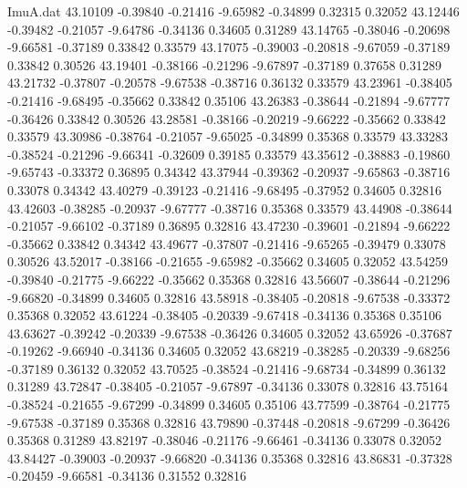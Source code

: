 \begin{filecontents}{ImuA.dat}
  43.10109   -0.39840   -0.21416   -9.65982   -0.34899    0.32315    0.32052
  43.12446   -0.39482   -0.21057   -9.64786   -0.34136    0.34605    0.31289
  43.14765   -0.38046   -0.20698   -9.66581   -0.37189    0.33842    0.33579
  43.17075   -0.39003   -0.20818   -9.67059   -0.37189    0.33842    0.30526
  43.19401   -0.38166   -0.21296   -9.67897   -0.37189    0.37658    0.31289
  43.21732   -0.37807   -0.20578   -9.67538   -0.38716    0.36132    0.33579
  43.23961   -0.38405   -0.21416   -9.68495   -0.35662    0.33842    0.35106
  43.26383   -0.38644   -0.21894   -9.67777   -0.36426    0.33842    0.30526
  43.28581   -0.38166   -0.20219   -9.66222   -0.35662    0.33842    0.33579
  43.30986   -0.38764   -0.21057   -9.65025   -0.34899    0.35368    0.33579
  43.33283   -0.38524   -0.21296   -9.66341   -0.32609    0.39185    0.33579
  43.35612   -0.38883   -0.19860   -9.65743   -0.33372    0.36895    0.34342
  43.37944   -0.39362   -0.20937   -9.65863   -0.38716    0.33078    0.34342
  43.40279   -0.39123   -0.21416   -9.68495   -0.37952    0.34605    0.32816
  43.42603   -0.38285   -0.20937   -9.67777   -0.38716    0.35368    0.33579
  43.44908   -0.38644   -0.21057   -9.66102   -0.37189    0.36895    0.32816
  43.47230   -0.39601   -0.21894   -9.66222   -0.35662    0.33842    0.34342
  43.49677   -0.37807   -0.21416   -9.65265   -0.39479    0.33078    0.30526
  43.52017   -0.38166   -0.21655   -9.65982   -0.35662    0.34605    0.32052
  43.54259   -0.39840   -0.21775   -9.66222   -0.35662    0.35368    0.32816
  43.56607   -0.38644   -0.21296   -9.66820   -0.34899    0.34605    0.32816
  43.58918   -0.38405   -0.20818   -9.67538   -0.33372    0.35368    0.32052
  43.61224   -0.38405   -0.20339   -9.67418   -0.34136    0.35368    0.35106
  43.63627   -0.39242   -0.20339   -9.67538   -0.36426    0.34605    0.32052
  43.65926   -0.37687   -0.19262   -9.66940   -0.34136    0.34605    0.32052
  43.68219   -0.38285   -0.20339   -9.68256   -0.37189    0.36132    0.32052
  43.70525   -0.38524   -0.21416   -9.68734   -0.34899    0.36132    0.31289
  43.72847   -0.38405   -0.21057   -9.67897   -0.34136    0.33078    0.32816
  43.75164   -0.38524   -0.21655   -9.67299   -0.34899    0.34605    0.35106
  43.77599   -0.38764   -0.21775   -9.67538   -0.37189    0.35368    0.32816
  43.79890   -0.37448   -0.20818   -9.67299   -0.36426    0.35368    0.31289
  43.82197   -0.38046   -0.21176   -9.66461   -0.34136    0.33078    0.32052
  43.84427   -0.39003   -0.20937   -9.66820   -0.34136    0.35368    0.32816
  43.86831   -0.37328   -0.20459   -9.66581   -0.34136    0.31552    0.32816

\end{filecontents}
